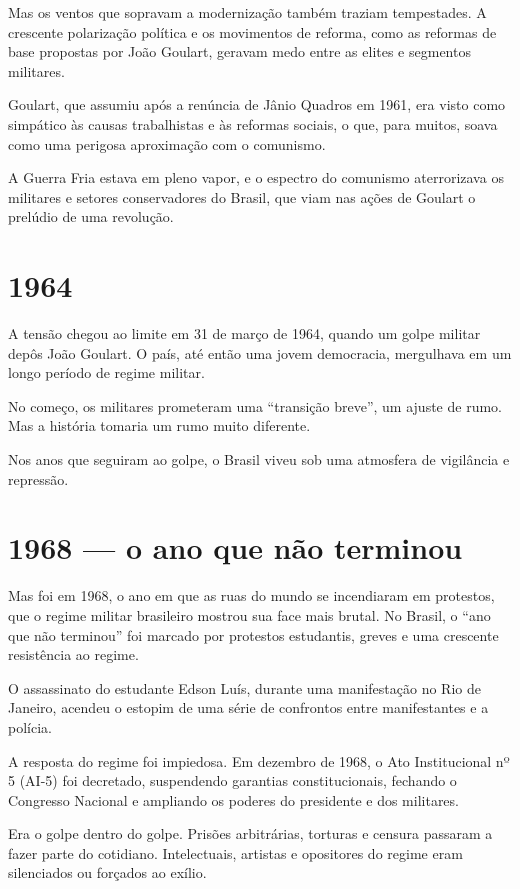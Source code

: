 Mas os ventos que sopravam a modernização também traziam tempestades. A crescente polarização política e os movimentos de reforma, como as reformas de base propostas por João Goulart, geravam medo entre as elites e segmentos militares.

Goulart, que assumiu após a renúncia de Jânio Quadros em 1961, era visto como simpático às causas trabalhistas e às reformas sociais, o que, para muitos, soava como uma perigosa aproximação com o comunismo.

A Guerra Fria estava em pleno vapor, e o espectro do comunismo aterrorizava os militares e setores conservadores do Brasil, que viam nas ações de Goulart o prelúdio de uma revolução.

\section*{1964}

A tensão chegou ao limite em 31 de março de 1964, quando um golpe militar depôs João Goulart. O país, até então uma jovem democracia, mergulhava em um longo período de regime militar.

No começo, os militares prometeram uma ``transição breve'', um ajuste de rumo. Mas a história tomaria um rumo muito diferente.

Nos anos que seguiram ao golpe, o Brasil viveu sob uma atmosfera de vigilância e repressão.

\section*{1968 — o ano que não terminou}

Mas foi em 1968, o ano em que as ruas do mundo se incendiaram em protestos, que o regime militar brasileiro mostrou sua face mais brutal. No Brasil, o ``ano que não terminou'' foi marcado por protestos estudantis, greves e uma crescente resistência ao regime.

O assassinato do estudante Edson Luís, durante uma manifestação no Rio de Janeiro, acendeu o estopim de uma série de confrontos entre manifestantes e a polícia.

A resposta do regime foi impiedosa. Em dezembro de 1968, o Ato Institucional nº 5 (AI-5) foi decretado, suspendendo garantias constitucionais, fechando o Congresso Nacional e ampliando os poderes do presidente e dos militares.

Era o golpe dentro do golpe. Prisões arbitrárias, torturas e censura passaram a fazer parte do cotidiano. Intelectuais, artistas e opositores do regime eram silenciados ou forçados ao exílio.

